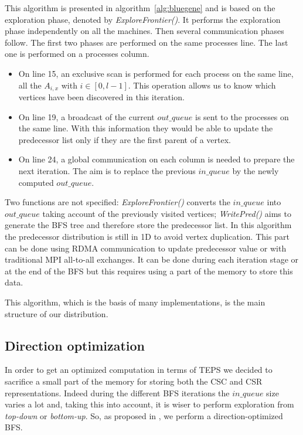 This algorithm is presented in algorithm~\ref{alg:bluegene} and is based on the exploration phase, denoted by \textit{ExploreFrontier()}. It performs the exploration phase independently on all the machines.
Then several communication phases follow. 
The first two phases are performed on the same processes line. The last one is performed on a processes column. 
\begin{itemize}
	\item On line 15, an exclusive scan is performed for each process on the same line, all the $A_{i,x}$ with $i \in [0,l-1]$. 
	This operation allows us to know which vertices have been discovered in this iteration.
	\item On line  19, a broadcast of the current $out\_queue$ is sent to the processes on the same line. With this information they would be able to update the predecessor list only if they are the first parent of a vertex.
	\item On line 24, a global communication on each column is needed to prepare the next iteration. 
	The aim is to replace the previous $in\_queue$ by the newly computed $out\_queue$.
\end{itemize}

Two functions are not specified: 
\textit{ExploreFrontier()} converts the $in\_queue$ into $out\_queue$ taking account of the previously visited vertices;
\textit{WritePred()} aims to generate the BFS tree and therefore store the predecessor list. In this algorithm the predecessor distribution is still in 1D to avoid vertex duplication. 
	This part can be done using RDMA communication to update predecessor value or with traditional MPI all-to-all exchanges.
	It can be done during each iteration stage or at the end of the BFS but this requires using a part of the memory to store this data. 

This algorithm, which is the basis of many implementations, is the main structure of our distribution. 

\subsection{Direction optimization}

In order to get an optimized computation in terms of TEPS we decided to sacrifice a small part of the memory for storing both the CSC and CSR representations. 
Indeed during the different BFS iterations the $in\_queue$ size varies a lot and, taking this into account, it is wiser to perform exploration from \textit{top-down} or \textit{bottom-up}. 
So, as proposed in \cite{beamer2013direction}, we perform a direction-optimized BFS.

